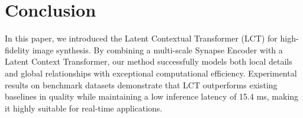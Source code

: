 \section{Conclusion}
In this paper, we introduced the Latent Contextual Transformer (LCT) for high-fidelity image synthesis. By combining a multi-scale Synapse Encoder with a Latent Context Transformer, our method successfully models both local details and global relationships with exceptional computational efficiency. Experimental results on benchmark datasets demonstrate that LCT outperforms existing baselines in quality while maintaining a low inference latency of 15.4 ms, making it highly suitable for real-time applications.



